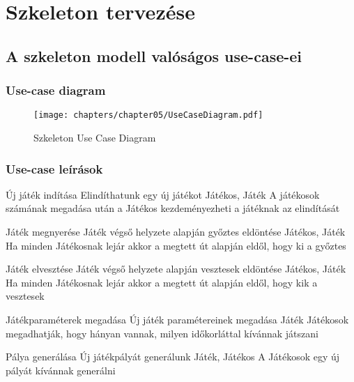 %
\chapter{Szkeleton tervezése}

\thispagestyle{fancy}

\section{A szkeleton modell valóságos use-case-ei}

\subsection{Use-case diagram}

\begin{figure}[h]
\begin{center}
\texttt{[image: chapters/chapter05/UseCaseDiagram.pdf]}
\caption{Szkeleton Use Case Diagram}
\label{fig:SzkeletonUseCase}
\end{center}
\end{figure}

\subsection{Use-case leírások}

\usecase%
{Új játék indítása}%
{Elindíthatunk egy új játékot}%
{Játékos, Játék}%
{A játékosok számának megadása után a Játékos kezdeményezheti a játéknak az elindítását}

\usecase%
{Játék megnyerése}%
{Játék végső helyzete alapján győztes eldöntése}%
{Játékos, Játék}%
{Ha minden Játékosnak lejár akkor a megtett út alapján eldől, hogy ki a győztes}

\usecase%
{Játék elvesztése}%
{Játék végső helyzete alapján vesztesek eldöntése}%
{Játékos, Játék}%
{Ha minden Játékosnak lejár akkor a megtett út alapján eldől, hogy kik a vesztesek}

\usecase%
{Játékparaméterek megadása}%
{Új játék paramétereinek megadása}%
{Játék}%
{Játékosok megadhatják, hogy hányan vannak, milyen időkorláttal kívánnak játszani}

\usecase%
{Pálya generálása}%
{Új játékpályát generálunk}%
{Játék, Játékos}%
{A Játékosok egy új pályát kívánnak generálni}

